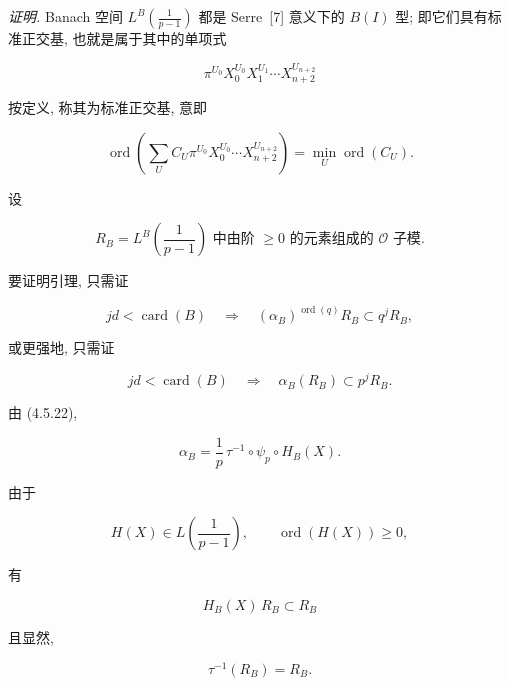 \noindent\emph{证明.}
Banach 空间 $L^B\!\left(\frac1{p-1}\right)$ 都是 Serre~[7] 意义下的 $B(I)$ 型;
即它们具有标准正交基, 也就是属于其中的单项式

\begin{equation}\tag{4.6.9}
\pi^{U_0}X_0^{U_0}X_1^{U_1}\cdots X_{n+2}^{U_{n+2}}
\end{equation}

\noindent
按定义, 称其为标准正交基, 意即

\begin{equation}\tag{4.6.10}
\operatorname{ord}\!\left(
\sum_U C_U\pi^{U_0}X_0^{U_0}\cdots X_{n+2}^{U_{n+2}}
\right)
=\min_U\operatorname{ord}(C_U).
\end{equation}

设

\begin{equation}\tag{4.6.11}
R_B=\text{$L^B\!\left(\frac1{p-1}\right)$ 中由阶 $\geq0$ 的元素组成的 $\mathcal O$ 子模}.
\end{equation}

要证明引理, 只需证

\begin{equation}\tag{4.6.12}
jd<\operatorname{card}(B)
\quad\Longrightarrow\quad
(\alpha_B)^{\operatorname{ord}(q)}R_B\subset q^jR_B,
\end{equation}

或更强地, 只需证

\begin{equation}\tag{4.6.13}
jd<\operatorname{card}(B)
\quad\Longrightarrow\quad
\alpha_B(R_B)\subset p^jR_B.
\end{equation}

由 (4.5.22),

\begin{equation}\tag{4.6.14}
\alpha_B=\frac1p\,\tau^{-1}\circ\psi_p\circ H_B(X).
\end{equation}

由于

\begin{equation}\tag{4.6.15}
H(X)\in L\!\left(\frac1{p-1}\right),
\qquad \operatorname{ord}(H(X))\geq0,
\end{equation}

有

\begin{equation}\tag{4.6.16}
H_B(X)\,R_B\subset R_B
\end{equation}

且显然,

\begin{equation}\tag{4.6.17}
\tau^{-1}(R_B)=R_B.
\end{equation}

